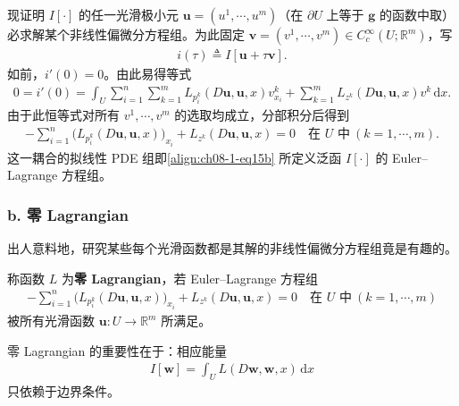 \documentclass[../../main.tex]{subfiles}
\begin{document}
现证明 $I[\cdot]$ 的任一光滑极小元 $\mathbf{u}=(u^1,\cdots,u^m)$（在 $\partial U$ 上等于 $\mathbf{g}$ 的函数中取）必求解某个非线性偏微分方程组。为此固定 $\mathbf{v}=(v^1,\cdots,v^m)\in C_c^\infty(U;\mathbb{R}^m)$，写
\begin{align*}
i(\tau)\triangleq I[\mathbf{u}+\tau\mathbf{v}].
\end{align*}
如前，$i'(0)=0$。由此易得等式
\begin{align*}
0=i'(0)=\int_U\sum_{i=1}^n\sum_{k=1}^m L_{p_i^k}(D\mathbf{u},\mathbf{u},x)v_{x_i}^k+\sum_{k=1}^m L_{z^k}(D\mathbf{u},\mathbf{u},x)v^k\,\mathrm{d}x.
\end{align*}
由于此恒等式对所有 $v^1,\cdots,v^m$ 的选取均成立，分部积分后得到
\begin{align}
-\sum_{i=1}^n\big(L_{p_i^k}(D\mathbf{u},\mathbf{u},x)\big)_{x_i}+L_{z^k}(D\mathbf{u},\mathbf{u},x)=0\quad\text{在 }U\text{ 中}\ (k=1,\cdots,m).\label{align:ch08-1-eq16}
\end{align}
这一耦合的拟线性 PDE 组即\eqref{align:ch08-1-eq15b} 所定义泛函 $I[\cdot]$ 的 Euler--Lagrange 方程组。

\subsubsection*{b. 零 Lagrangian}

出人意料地，研究某些每个光滑函数都是其解的非线性偏微分方程组竟是有趣的。

\begin{definition}\label{definition:ch08-1-零Lagrangian}
称函数 $L$ 为\textbf{零 Lagrangian}，若 Euler--Lagrange 方程组
\begin{align}
-\sum_{i=1}^n\big(L_{p_i^k}(D\mathbf{u},\mathbf{u},x)\big)_{x_i}+L_{z^k}(D\mathbf{u},\mathbf{u},x)=0\quad\text{在 }U\text{ 中}\ (k=1,\cdots,m)\label{align:ch08-1-eq17}
\end{align}
被所有光滑函数 $\mathbf{u}:U\to\mathbb{R}^m$ 所满足。
\end{definition}

零 Lagrangian 的重要性在于：相应能量
\begin{align*}
I[\mathbf{w}]=\int_U L(D\mathbf{w},\mathbf{w},x)\,\mathrm{d}x
\end{align*}
只依赖于边界条件。
\end{document}
